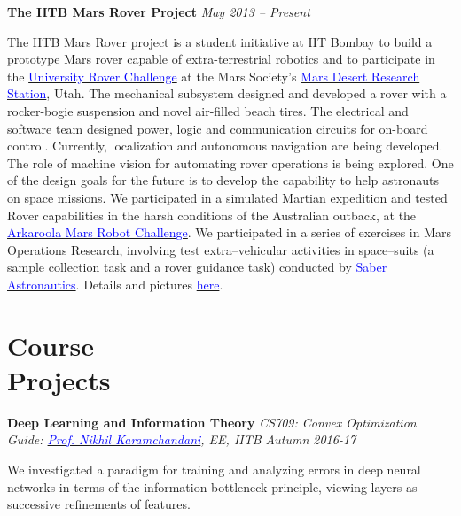 \documentclass[margin,line]{res}
\newenvironment{list1}{
  \begin{list}{\ding{113}}{%
      \setlength{\itemsep}{0in}
      \setlength{\parsep}{0in} \setlength{\parskip}{0in}
      \setlength{\topsep}{0in} \setlength{\partopsep}{0in} 
      \setlength{\leftmargin}{0.17in}}}{\end{list}}
\begin{document}
\begin{resume}
{\bf The IITB Mars Rover Project}
\hfill {\it May 2013 -- Present} \\
\vspace*{-.13in}
\begin{list1}
\item[]
The IITB Mars Rover project is a student initiative at IIT Bombay to build a prototype Mars rover capable of extra-terrestrial robotics and to participate in the \href{http://urc.marssociety.org/}{\textcolor{blue} {University Rover Challenge}} at the Mars Society's \href{http://mdrs.marssociety.org/}{\textcolor{blue} {Mars Desert Research Station}}, Utah. The mechanical subsystem designed and developed a rover with a rocker-bogie suspension and novel air-filled beach tires. The electrical and software team designed power, logic and communication circuits for on-board control. Currently, localization and autonomous navigation are being developed. The role of machine vision for automating rover operations is being explored. One of the design goals for the future is to develop the capability to help astronauts on space missions. We participated in a simulated Martian expedition and tested Rover capabilities in the harsh conditions of the Australian outback, at the \href{http://marssociety.org.au/article/arkaroola-mars-robot-challenge-spaceward-bound-expedition}{\textcolor{blue} {Arkaroola Mars Robot Challenge}}. We participated in a series of exercises in Mars Operations Research, involving test extra--vehicular activities in space--suits (a sample collection task and a rover guidance task) conducted by \href{https://saberastro.com/}{\textcolor{blue} {Saber Astronautics}}. Details and pictures \href{http://alankarkotwal.github.io/#projects}{\textcolor{blue} {here}}.
\end{list1}

\section{\sc Course \\Projects}
{\bf Deep Learning and Information Theory} \hfill {\it CS709: Convex Optimization} \\
{\em Guide: \href{https://www.ee.iitb.ac.in/~nikhilk/}{\textcolor{blue}{Prof. Nikhil Karamchandani}}, EE, IITB \hfill Autumn 2016-17} \\
\vspace*{-.15in}
\begin{list1}
\item[] We investigated a paradigm for training and analyzing errors in deep neural networks in terms of the information bottleneck principle, viewing layers as successive refinements of features.
\end{list1}


\end{resume}
\end{document}
